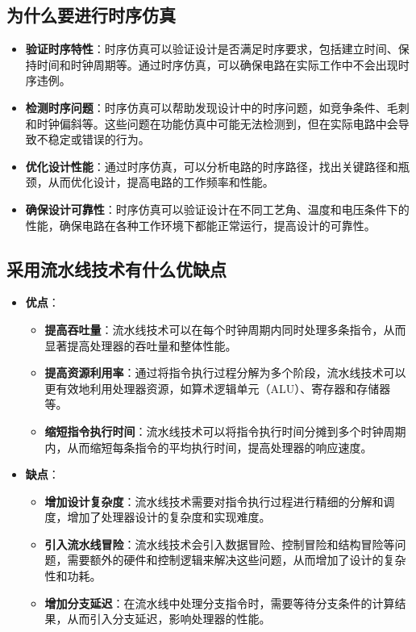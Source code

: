 \documentclass[12pt,hyperref,a4paper,UTF8]{ctexart}
\begin{document}
\subsection{为什么要进行时序仿真}
\begin{itemize}
    \item \textbf{验证时序特性}：时序仿真可以验证设计是否满足时序要求，包括建立时间、保持时间和时钟周期等。通过时序仿真，可以确保电路在实际工作中不会出现时序违例。
    \item \textbf{检测时序问题}：时序仿真可以帮助发现设计中的时序问题，如竞争条件、毛刺和时钟偏斜等。这些问题在功能仿真中可能无法检测到，但在实际电路中会导致不稳定或错误的行为。
    \item \textbf{优化设计性能}：通过时序仿真，可以分析电路的时序路径，找出关键路径和瓶颈，从而优化设计，提高电路的工作频率和性能。
    \item \textbf{确保设计可靠性}：时序仿真可以验证设计在不同工艺角、温度和电压条件下的性能，确保电路在各种工作环境下都能正常运行，提高设计的可靠性。
\end{itemize}
\subsection{采用流水线技术有什么优缺点}
\begin{itemize}
    \item \textbf{优点}：
    \begin{itemize}
        \item \textbf{提高吞吐量}：流水线技术可以在每个时钟周期内同时处理多条指令，从而显著提高处理器的吞吐量和整体性能。
        \item \textbf{提高资源利用率}：通过将指令执行过程分解为多个阶段，流水线技术可以更有效地利用处理器资源，如算术逻辑单元（ALU）、寄存器和存储器等。
        \item \textbf{缩短指令执行时间}：流水线技术可以将指令执行时间分摊到多个时钟周期内，从而缩短每条指令的平均执行时间，提高处理器的响应速度。
    \end{itemize}
    \item \textbf{缺点}：
    \begin{itemize}
        \item \textbf{增加设计复杂度}：流水线技术需要对指令执行过程进行精细的分解和调度，增加了处理器设计的复杂度和实现难度。
        \item \textbf{引入流水线冒险}：流水线技术会引入数据冒险、控制冒险和结构冒险等问题，需要额外的硬件和控制逻辑来解决这些问题，从而增加了设计的复杂性和功耗。
        \item \textbf{增加分支延迟}：在流水线中处理分支指令时，需要等待分支条件的计算结果，从而引入分支延迟，影响处理器的性能。
    \end{itemize}
\end{itemize}




\end{document}
